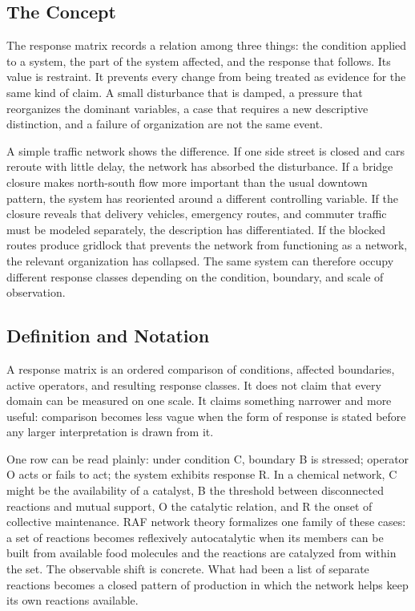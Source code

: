 \documentclass[11pt,a4paper,openany]{book}
\begin{document}
\subsection{The Concept}
The response matrix records a relation among three things: the condition applied to a system, the part of the system affected, and the response that follows. Its value is restraint. It prevents every change from being treated as evidence for the same kind of claim. A small disturbance that is damped, a pressure that reorganizes the dominant variables, a case that requires a new descriptive distinction, and a failure of organization are not the same event. \cite{nicolis_prigogine_selforg,kauffman_autocatalytic}\par
A simple traffic network shows the difference. If one side street is closed and cars reroute with little delay, the network has absorbed the disturbance. If a bridge closure makes north-south flow more important than the usual downtown pattern, the system has reoriented around a different controlling variable. If the closure reveals that delivery vehicles, emergency routes, and commuter traffic must be modeled separately, the description has differentiated. If the blocked routes produce gridlock that prevents the network from functioning as a network, the relevant organization has collapsed. The same system can therefore occupy different response classes depending on the condition, boundary, and scale of observation.\par
\subsection{Definition and Notation}
A response matrix is an ordered comparison of conditions, affected boundaries, active operators, and resulting response classes. It does not claim that every domain can be measured on one scale. It claims something narrower and more useful: comparison becomes less vague when the form of response is stated before any larger interpretation is drawn from it. \cite{nicolis_prigogine_selforg,kauffman_autocatalytic}\par
One row can be read plainly: under condition C, boundary B is stressed; operator O acts or fails to act; the system exhibits response R. In a chemical network, C might be the availability of a catalyst, B the threshold between disconnected reactions and mutual support, O the catalytic relation, and R the onset of collective maintenance. RAF network theory formalizes one family of these cases: a set of reactions becomes reflexively autocatalytic when its members can be built from available food molecules and the reactions are catalyzed from within the set. The observable shift is concrete. What had been a list of separate reactions becomes a closed pattern of production in which the network helps keep its own reactions available.\par
\end{document}
